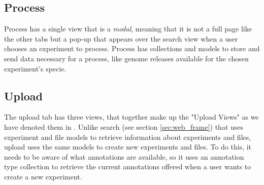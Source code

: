 \subsection{Process}
Process has a single view that is a \textit{modal}, meaning that it is not a full page like the other tabs but a pop-up that appears over the search view when a user chooses an experiment to process. Process has collections and models to store and send data necessary for a process, like genome releases available for the chosen experiment's specie.   

\subsection{Upload}
The upload tab has three views, that together make up the "Upload Views" as we have denoted them in . Unlike search (see section \ref{sec:web_frame}) that uses experiment and file models to retrieve information about experiments and files, upload uses the same models to create new experiments and files. To do this, it needs to be aware of what annotations are available, so it uses an annotation type collection to retrieve the current annotations offered when a user wants to create a new experiment.
